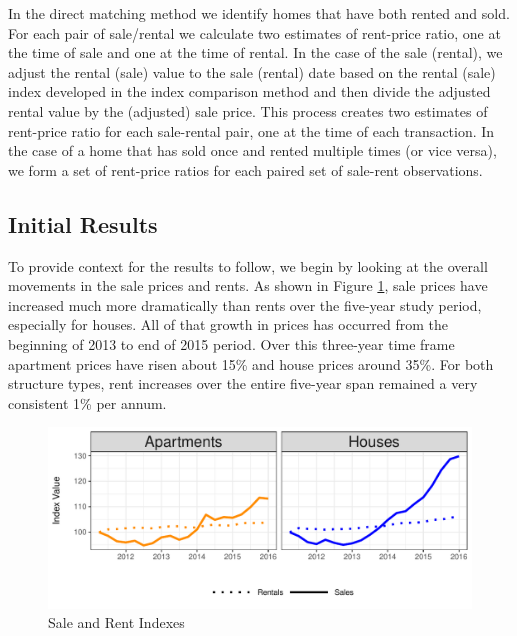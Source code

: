 \documentclass{article}\usepackage[]{graphicx}\usepackage[]{color}
\makeatletter
\def\maxwidth{ %
  \ifdim\Gin@nat@width>\linewidth
    \linewidth
  \else
    \Gin@nat@width
  \fi
}
\makeatother
\begin{document}
In the direct matching method we identify homes that have both rented and sold.  For each pair of sale/rental we calculate two estimates of rent-price ratio, one at the time of sale and one at the time of rental.  In the case of the sale (rental), we adjust the rental (sale) value to the sale (rental) date based on the rental (sale) index developed in the index comparison method and then divide the adjusted rental value by the (adjusted) sale price. This process creates two estimates of rent-price ratio for each sale-rental pair, one at the time of each transaction.  In the case of a home that has sold once and rented multiple times (or vice versa), we form a set of rent-price ratios for each paired set of sale-rent observations.\par

\subsection*{Initial Results}

To provide context for the results to follow, we begin by looking at the overall movements in the sale prices and rents. As shown in Figure \ref{fig:srindexes}, sale prices have increased much more dramatically than rents over the five-year study period, especially for houses. All of that growth in prices has occurred from the beginning of 2013 to end of 2015 period.  Over this three-year time frame apartment prices have risen about 15\% and house prices around 35\%.  For both structure types, rent increases over the entire five-year span remained a very consistent 1\% per annum.



\begin{figure}
 \centering

\includegraphics[width=\maxwidth]{figure/index_plot-1} 


\caption{Sale and Rent Indexes}
\label{fig:srindexes}
\end{figure}
\end{document}
